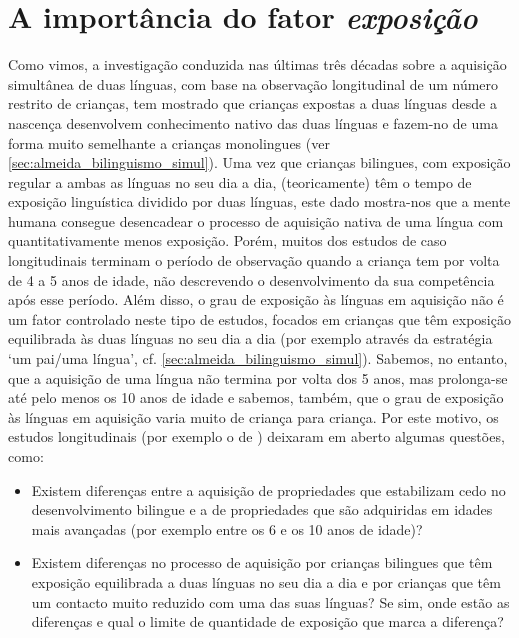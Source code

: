 \documentclass[output=paper]{LSP/langsci}
\begin{document}
\section{A importância do fator \textit{exposição}}%
\label{sec:almeida_importancia}

Como vimos, a investigação conduzida nas últimas três décadas sobre a aquisição simultânea de duas línguas, com base na observação longitudinal de um número restrito de crianças, tem mostrado que crianças expostas a duas línguas desde a nascença desenvolvem conhecimento nativo das duas línguas e fazem-no de uma forma muito semelhante a crianças monolingues (ver \ref{sec:almeida_bilinguismo_simul}). Uma vez que crianças bilingues, com exposição regular a ambas as línguas no seu dia a dia, (teoricamente) têm o tempo de exposição linguística dividido por duas línguas, este dado mostra-nos que a mente humana consegue desencadear o processo de aquisição nativa de uma língua com quantitativamente menos exposição. Porém, muitos dos estudos de caso longitudinais terminam o período de observação quando a criança tem por volta de 4 a 5 anos de idade, não descrevendo o desenvolvimento da sua competência após esse período. Além disso, o grau de exposição às línguas em aquisição não é um fator controlado neste tipo de estudos, focados em crianças que têm exposição equilibrada às duas línguas no seu dia a dia (por exemplo através da estratégia `um pai/uma língua', cf. \ref{sec:almeida_bilinguismo_simul}). Sabemos, no entanto, que a aquisição de uma língua não termina por volta dos 5 anos, mas prolonga-se até pelo menos os 10 anos de idade e sabemos, também, que o grau de exposição às línguas em aquisição varia muito de criança para criança. Por este motivo, os estudos longitudinais (por exemplo o de \citealt{leisel1989}) deixaram em aberto algumas questões, como:\largerpage

\begin{itemize}
\item Existem diferenças entre a aquisição de propriedades que estabilizam cedo no desenvolvimento bilingue e a de propriedades que são adquiridas em idades mais avançadas (por exemplo entre os 6 e os 10 anos de idade)?
\item Existem diferenças no processo de aquisição por crianças bilingues que têm exposição equilibrada a duas línguas no seu dia a dia e por crianças que têm um contacto muito reduzido com uma das suas línguas? Se sim, onde estão as diferenças e qual o limite de quantidade de exposição que marca a diferença?
\end{itemize}
\end{document}
